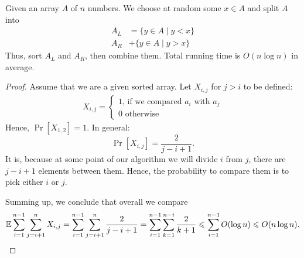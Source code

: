 \begin{algorithm} \label{alg:quick_sort}
    Given an array $A$ of $n$ numbers.
    We choose at random some $x \in A$ and split $A$ into
    \begin{align*}
        A_L &= \{y \in A \mid y < x\} \\
        A_R &+ \{y \in A \mid y > x\}
    \end{align*}
    Thus, sort $A_L$ and $A_R$, then combine them.
    Total running time is $O(n \log n)$ in average.
\end{algorithm}
\begin{proof}
    Assume that we are a given sorted array.
    Let $X_{i, j}$ for $j > i$ to be defined:
    \begin{align*}
        X_{i, j} = \begin{cases} 1 \text{, if we compared } a_i \text{ with } a_j \\ 0 \text{ otherwise} \end{cases}
    \end{align*}
    Hence, $\Pr[X_{1, 2}] = 1$.
    In general:
    \[
      \Pr[X_{i, j}] = \frac 2 {j - i + 1}.
    \]
    It is, because at some point of our algorithm we will divide $i$ from $j$, there are $j - i + 1$ elements between them.
    Hence, the probability to compare them is to pick either $i$ or $j$.

    Summing up, we conclude that overall we compare
    \[
        \mathbb{E} \sum_{i = 1}^{n - 1} \sum_{j = i + 1}^n X_{i, j} = \sum_{i = 1}^{n - 1} \sum_{j = i + 1}^n \frac 2 {j - i + 1} = \sum_{i = 1}^{n - 1} \sum_{k = 1}^{n - i} \frac {2} {k + 1} \leqslant \sum_{i = 1}^{n - 1} O(\log n) \leqslant O(n \log n). \qedhere
    \]

\end{proof}

